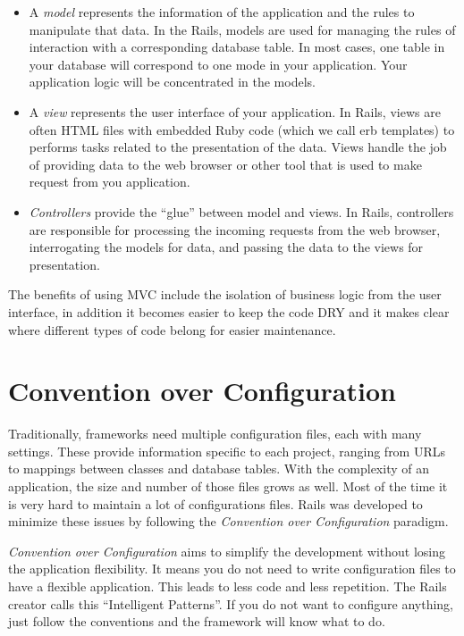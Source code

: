 \begin{itemize}
\item A \emph{model} represents the information of the application and the rules to manipulate that data. In the Rails, models are used for managing the rules of interaction with a corresponding database table. In most cases, one table in your database will correspond to one mode in your application. Your application logic will be concentrated in the models.
\item A \emph{view} represents the user interface of your application. In Rails, views are often HTML files with embedded Ruby code (which we call erb templates) to performs tasks related to the presentation of the data. Views handle the job of providing data to the web browser or other tool that is used to make request from you application.
\item \emph{Controllers} provide the “glue” between model and views. In Rails, controllers are responsible for processing the incoming requests from the web browser, interrogating the models for data, and passing the data to the views for presentation.
\end{itemize}

The benefits of using MVC include the isolation of business logic from the user interface,
in addition it becomes easier to keep the code DRY and 
it makes clear where different types of code belong for easier maintenance.



\section{Convention over Configuration} 
Traditionally, frameworks need multiple configuration files, each with many settings. 
These provide information specific to each project, ranging from URLs to mappings between classes and database tables. 
With the complexity of an application, the size and number of those files grows as well. 
Most of the time it is very hard to maintain a lot of configurations files. 
Rails was developed to minimize these issues by following the \emph{Convention over Configuration} paradigm.

\emph{Convention over Configuration} aims to simplify the development without losing the application flexibility. 
It means you do not need to write configuration files to have a flexible application. 
This leads to less code and less repetition.
The Rails creator calls this “Intelligent Patterns”. 
If you do not want to configure anything, just follow the conventions and the framework will know what to do.

